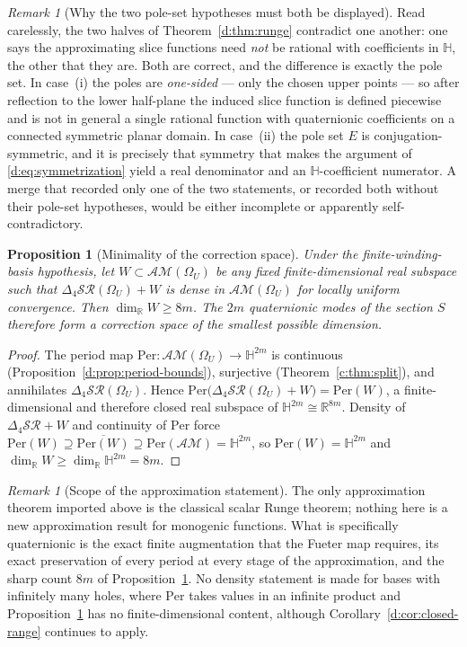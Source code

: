 \documentclass[11pt,a4paper]{article}
\numberwithin{equation}{section}
\newtheorem{proposition}[theorem]{Proposition}
\theoremstyle{definition}
\theoremstyle{remark}
\newtheorem{remark}[theorem]{Remark}
\theoremstyle{plain}
\newcommand{\HH}{\mathbb H}
\newcommand{\RR}{\mathbb R}
\newcommand{\lap}{\Delta_4}
\newcommand{\SR}{\mathcal{SR}}
\newcommand{\AM}{\mathcal{AM}}
\newcommand{\Om}{\Omega}
\newcommand{\Per}{\mathrm{Per}}
\begin{document}
\begin{remark}[Why the two pole-set hypotheses must both be displayed]
\label{d:rem:pole-sets}
Read carelessly, the two halves of Theorem~\ref{d:thm:runge} contradict one
another: one says the approximating slice functions need \emph{not} be
rational with coefficients in $\HH$, the other that they are.  Both are
correct, and the difference is exactly the pole set.  In case~(i) the poles
are \emph{one-sided} --- only the chosen upper points --- so after
reflection to the lower half-plane the induced slice function is defined
piecewise and is not in general a single rational function with
quaternionic coefficients on a connected symmetric planar domain.  In
case~(ii) the pole set $E$ is conjugation-symmetric, and it is precisely
that symmetry that makes the argument of \eqref{d:eq:symmetrization} yield
a real denominator and an $\HH$-coefficient numerator.  A merge that
recorded only one of the two statements, or recorded both without their
pole-set hypotheses, would be either incomplete or apparently
self-contradictory.
\end{remark}

\begin{proposition}[Minimality of the correction space]
\label{d:prop:minimality}
Under the finite-winding-basis hypothesis, let $W\subset\AM(\Om_U)$ be any
fixed finite-dimensional \emph{real} subspace such that
$\lap\SR(\Om_U)+W$ is dense in $\AM(\Om_U)$ for locally uniform
convergence.  Then $\dim_\RR W\ge8m$.  The $2m$ quaternionic modes of the
section $S$ therefore form a correction space of the smallest possible
dimension.
\end{proposition}

\begin{proof}
The period map $\Per:\AM(\Om_U)\to\HH^{2m}$ is continuous
(Proposition~\ref{d:prop:period-bounds}), surjective (Theorem~\ref{c:thm:split}), and
annihilates $\lap\SR(\Om_U)$.  Hence
$\Per\bigl(\lap\SR(\Om_U)+W\bigr)=\Per(W)$, a finite-dimensional and
therefore closed real subspace of $\HH^{2m}\cong\RR^{8m}$.  Density of
$\lap\SR+W$ and continuity of $\Per$ force
$\Per(W)\supseteq\overline{\Per(W)}\supseteq\Per(\AM)=\HH^{2m}$, so
$\Per(W)=\HH^{2m}$ and $\dim_\RR W\ge\dim_\RR\HH^{2m}=8m$.
\end{proof}

\begin{remark}[Scope of the approximation statement]
\label{d:rem:runge-scope}
The only approximation theorem imported above is the classical scalar Runge
theorem; nothing here is a new approximation result for monogenic
functions.  What is specifically quaternionic is the exact finite
augmentation that the Fueter map requires, its exact preservation of every
period at every stage of the approximation, and the sharp count $8m$ of
Proposition~\ref{d:prop:minimality}.  No density statement is made for
bases with infinitely many holes, where $\Per$ takes values in an infinite
product and Proposition~\ref{d:prop:minimality} has no finite-dimensional
content, although Corollary~\ref{d:cor:closed-range} continues to apply.
\end{remark}
\end{document}
